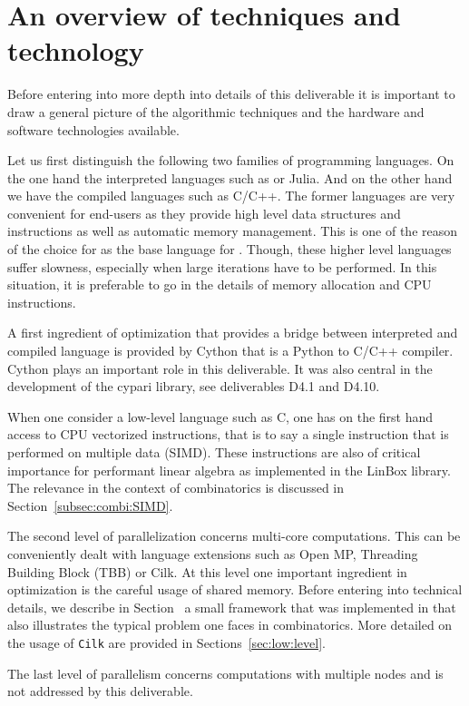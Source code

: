 \documentclass{deliverablereport}
\newcommand{\Cilk}{\texttt{Cilk}\xspace}
\begin{document}
\section{An overview of techniques and technology}

Before entering into more depth into details of this deliverable it is
important to draw a general picture of the algorithmic techniques
and the hardware and software technologies available.

Let us first distinguish the following two families of programming
languages. On the one hand the interpreted languages
such as \Python or Julia. And on the other hand we have the compiled languages
such as C/C++. The former languages are very convenient for end-users as
they provide high level data structures and instructions as well as automatic
memory management. This is one of the reason of the choice for \Python as the
base language for \Sage. Though, these higher level languages suffer slowness,
especially when large iterations have to be performed. In this situation, it is
preferable to go in the details of memory allocation and CPU instructions.

A first ingredient of optimization that provides a bridge between interpreted
and compiled language is provided by Cython that is a Python
to C/C++ compiler. Cython plays an important role in this deliverable. It
was also central in the development of the cypari library, see deliverables
D4.1 and D4.10.

When one consider a low-level language such as C, one has on the first hand
access to CPU vectorized instructions, that is to say a single instruction that
is performed on multiple data (SIMD). These
instructions are also of critical importance for performant linear
algebra as implemented in the LinBox library. The relevance in the context
of combinatorics is discussed in Section~\ref{subsec:combi:SIMD}.

The second level of parallelization concerns multi-core computations. This can
be conveniently dealt with language extensions such as Open MP,
Threading Building Block (TBB) or Cilk. At this level one important
ingredient in optimization is the careful usage of shared memory.
Before entering into technical details, we describe in
Section~\label{subsec:map-reduce:Sage} a small framework that was
implemented in \Sage that also illustrates the typical problem one faces
in combinatorics. More detailed on the usage of \Cilk are provided
in Sections~\ref{sec:low:level}.

The last level of parallelism concerns computations with multiple nodes
and is not addressed by this deliverable.
\end{document}
